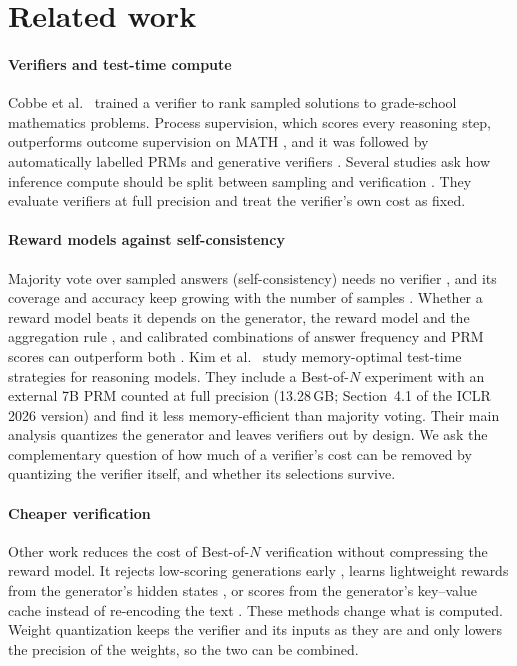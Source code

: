 \section{Related work}\label{sec:related}

\paragraph{Verifiers and test-time compute} Cobbe et al.~\cite{cobbe2021gsm8k} trained a
verifier to rank sampled solutions to grade-school mathematics problems. Process
supervision, which scores every reasoning step, outperforms outcome supervision on MATH
\cite{lightman2023verify}, and it was followed by automatically labelled PRMs
\cite{wang2023mathshepherd,setlur2024rewarding,zhang2025prm} and generative verifiers
\cite{zhang2024generative}. Several studies ask how inference compute should be split
between sampling and verification \cite{snell2024scaling,liu2025can,singhi2025when}.
They evaluate verifiers at full precision and treat the verifier's own cost as fixed.

\paragraph{Reward models against self-consistency} Majority vote over sampled answers
(self-consistency) needs no verifier \cite{wang2023selfconsistency}, and its coverage
and accuracy keep growing with the number of samples
\cite{brown2024large,wu2024inference}. Whether a reward model beats it depends on the
generator, the reward model and the aggregation rule
\cite{yuan2024free,di2025bestofmajority}, and calibrated combinations of answer
frequency and PRM scores can outperform both \cite{kuang2025aggregation}. Kim et
al.~\cite{kim2025not} study memory-optimal test-time strategies for reasoning models.
They include a Best-of-$N$ experiment with an external 7B PRM counted at full precision
(13.28\,GB; Section~4.1 of the ICLR 2026 version) and find it less memory-efficient
than majority voting. Their main analysis quantizes the generator and leaves verifiers
out by design. We ask the complementary question of how much of a verifier's cost
can be removed by quantizing the verifier itself, and whether its selections survive.

\paragraph{Cheaper verification} Other work reduces the cost of Best-of-$N$
verification without compressing the reward model. It rejects low-scoring generations
early \cite{sun2024speculative}, learns lightweight rewards from the generator's hidden
states \cite{guo2025swift}, or scores from the generator's key--value cache instead of
re-encoding the text \cite{kuang2026kvprm}. These methods change what is computed.
Weight quantization keeps the verifier and its inputs as they are and only lowers the
precision of the weights, so the two can be combined.

